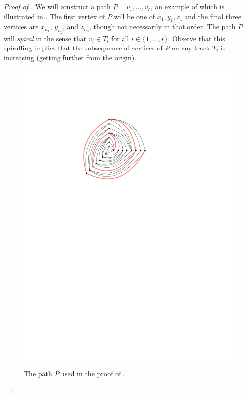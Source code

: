 \documentclass{patmorin}
\begin{document}
\begin{proof}[Proof of ]
  We will construct a path $P=v_1,\ldots,v_r$, an example of which is illustrated in . The first vertex of $P$ will be one of
  $x_1,y_1,z_1$ and the final three vertices are $x_{n_1}$,
  $y_{n_2}$, and $z_{n_3}$, though not necessarily in that order.
  The path $P$ will \emph{spiral} in the sense that $v_i\in T_i$
  for all $i\in\{1,\ldots,r\}$.  Observe that this spiralling implies that the subsequence of vertices of $P$ on any track $T_i$ is increasing (getting further from the origin).

  \begin{figure}
     \begin{center}
        \includegraphics{figs/graph-2}
     \end{center}
     \caption{The path $P$ used in the proof of .}
  \end{figure}


\end{proof}
\end{document}
